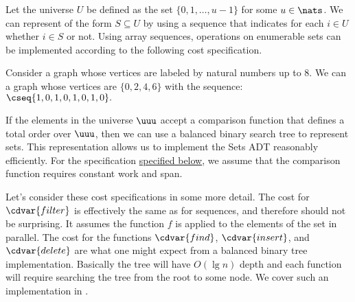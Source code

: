 \begin{flex}
\label{sets:cluster:arraysets}

\begin{costspec}
\label{XXcost:sets::arrayseqs}

Let the universe $U$ be defined as the set 
%
$\{ 0, 1, \ldots, u-1 \}$
%
for some $u \in \nats$.
%
We can represent  of the form $S \subseteq U$ by using a sequence that indicates for each $i \in U$ whether $i \in S$ or not.
%
Using array sequences, operations on enumerable sets can be implemented according to the following cost specification.
 

\end{costspec}


\begin{example}
Consider a graph whose vertices are labeled by natural numbers up to $8$.  We can a graph whose vertices are
%
$\{ 0, 2, 4, 6 \}$ 
%
with the sequence:
%
$\cseq{ 1, 0, 1, 0, 1, 0, 1, 0 }.$ 
\end{example}

\end{flex}


\begin{gram}
If the elements in the universe $\uuu$ accept a comparison function 
that defines a total order over $\uuu$, then we can use a balanced binary search tree to represent sets.
%
This representation allows us to implement the Sets ADT reasonably efficiently.
%
For the specification \href{cost:sets::trees}{specified below}, we assume that the comparison function requires constant work and span.  
%
\end{gram}

\begin{costspec}
\label{XXcost:sets::trees}

\end{costspec}

\begin{gram}
Let's consider these cost specifications in some more detail.  The
cost for $\cdvar{filter}$ is effectively the same as for sequences, and
therefore should not be surprising.  It assumes the function $f$ is
applied to the elements of the set in parallel.  The cost for the
functions $\cdvar{find}$, $\cdvar{insert}$, and $\cdvar{delete}$ are
what one might expect from a balanced binary tree implementation.
Basically the tree will have $O(\lg n)$ depth and each function will
require searching the tree from the root to some node.  We cover
such an implementation in .
\end{gram}

